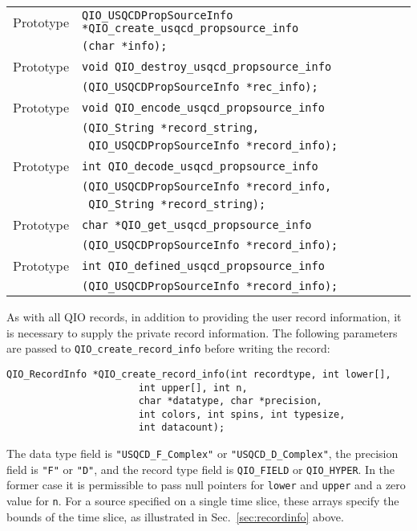 \documentclass{article}
\begin{document}
\begin{flushleft}
  \begin{tabular}{|l|l|}
  \hline
  Prototype      & \verb|QIO_USQCDPropSourceInfo *QIO_create_usqcd_propsource_info|\\
                 & \verb|(char *info);|\\
  Prototype      & \verb|void QIO_destroy_usqcd_propsource_info|\\
               & \verb|(QIO_USQCDPropSourceInfo *rec_info);|\\
Prototype      & \verb|void QIO_encode_usqcd_propsource_info|\\
               & \verb|(QIO_String *record_string, |\\
               & \verb| QIO_USQCDPropSourceInfo *record_info);|\\
Prototype      & \verb|int QIO_decode_usqcd_propsource_info|\\
               & \verb|(QIO_USQCDPropSourceInfo *record_info,|\\
               & \verb| QIO_String *record_string);|\\
Prototype      & \verb|char *QIO_get_usqcd_propsource_info|\\
               & \verb|(QIO_USQCDPropSourceInfo *record_info);|\\
Prototype      & \verb|int QIO_defined_usqcd_propsource_info|\\
               & \verb|(QIO_USQCDPropSourceInfo *record_info);|\\
 \hline
 \end{tabular}
\end{flushleft}
%

As with all QIO records, in addition to providing the user record
information, it is necessary to supply the private record information.
The following parameters are passed to \verb|QIO_create_record_info|
before writing the record:
%
\begin{verbatim}
QIO_RecordInfo *QIO_create_record_info(int recordtype, int lower[],
				       int upper[], int n,
				       char *datatype, char *precision, 
				       int colors, int spins, int typesize, 
				       int datacount);
\end{verbatim}
%
The data type field is \verb|"USQCD_F_Complex"| or
\verb|"USQCD_D_Complex"|, the precision field is \verb|"F"| or
\verb|"D"|, and the record type field is \verb|QIO_FIELD| or
\verb|QIO_HYPER|.  In the former case it is permissible to pass null
pointers for \verb|lower| and \verb|upper| and a zero value for
\verb|n|.  For a source specified on a single time slice, these arrays
specify the bounds of the time slice, as illustrated in
Sec.~\ref{sec:recordinfo} above.
\end{document}
